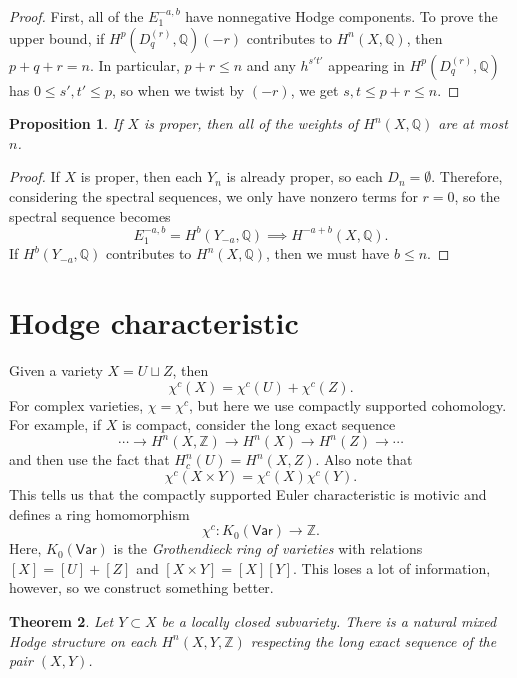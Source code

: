 \documentclass[leqno, openany]{memoir}
\newtheorem{thm}{Theorem}[section]
\newtheorem{prop}[thm]{Proposition}
\theoremstyle{definition}
\theoremstyle{remark}
\theoremstyle{plain}
\theoremstyle{definition}
\theoremstyle{remark}
\newcommand{\Z}{\mathbb{Z}}
\newcommand{\Q}{\mathbb{Q}}
\newcommand{\ms}[1]{\mathsf{#1}}
\begin{document}
\begin{proof}
    First, all of the $E_1^{-a,b}$ have nonnegative Hodge components. To prove the upper bound, if $H^p(D_q^{(r)}, \Q)(-r)$ contributes to $H^n(X, \Q)$, then $p+q+r = n$. In particular, $p + r \leq n$ and any $h^{s't'}$ appearing in $H^p(D_q^{(r)}, \Q)$ has $0 \leq s', t' \leq p$, so when we twist by $(-r)$, we get $s,t \leq p+r \leq n$.
\end{proof}

\begin{prop}
    If $X$ is proper, then all of the weights of $H^n(X, \Q)$ are at most $n$.
\end{prop}

\begin{proof}
    If $X$ is proper, then each $Y_n$ is already proper, so each $D_n = \emptyset$. Therefore, considering the spectral sequences, we only have nonzero terms for $r = 0$, so the spectral sequence becomes
    \[ E_1^{-a,b} = H^b(Y_{-a}, \Q) \implies H^{-a+b}(X, \Q). \]
    If $H^b(Y_{-a}, \Q)$ contributes to $H^n(X, \Q)$, then we must have $b \leq n$.
\end{proof}

\section{Hodge characteristic}%
\label{sec:hodge_characteristic}

Given a variety $X = U \sqcup Z$, then 
\[ \chi^c(X) = \chi^c(U) + \chi^c(Z). \] For complex varieties, $\chi = \chi^c$, but here we use compactly supported cohomology. For example, if $X$ is compact, consider the long exact sequence
\[ \cdots \to H^n(X, \Z) \to H^n(X) \to H^n(Z) \to \cdots \]
and then use the fact that $H_c^n(U) = H^n(X, Z)$. Also note that 
\[ \chi^c(X \times Y) = \chi^c(X) \chi^c(Y). \]
This tells us that the compactly supported Euler characteristic is motivic and defines a ring homomorphism
\[ \chi^c \colon K_0(\ms{Var}) \to \Z. \]
Here, $K_0(\ms{Var})$ is the \textit{Grothendieck ring of varieties} with relations $[X] = [U] + [Z]$ and $[X \times Y] = [X] [Y]$. This loses a lot of information, however, so we construct something better.

\begin{thm}
    Let $Y \subset X$ be a locally closed subvariety. There is a natural mixed Hodge structure on each $H^n(X, Y, \Z)$ respecting the long exact sequence of the pair $(X, Y)$.
\end{thm}
\end{document}

